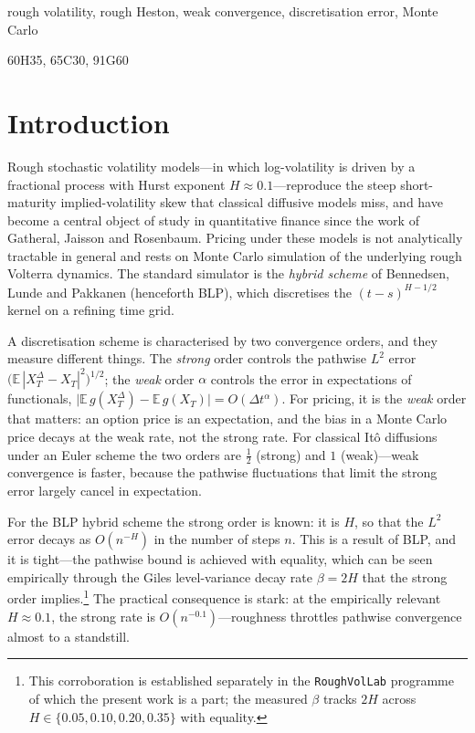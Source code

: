 \documentclass{siamonline250211}
\begin{document}
\begin{keywords}
rough volatility, rough Heston, weak convergence, discretisation error, Monte Carlo
\end{keywords}

\begin{AMS}
60H35, 65C30, 91G60
\end{AMS}

\section{Introduction}\label{sec:intro}

Rough stochastic volatility models---in which log-volatility is driven by a
fractional process with Hurst exponent $H\approx 0.1$---reproduce the steep
short-maturity implied-volatility skew that classical diffusive models miss, and
have become a central object of study in quantitative finance since the work of
Gatheral, Jaisson and Rosenbaum. Pricing under these models is not analytically
tractable in general and rests on Monte Carlo simulation of the underlying rough
Volterra dynamics. The standard simulator is the \emph{hybrid scheme} of
Bennedsen, Lunde and Pakkanen (henceforth BLP), which discretises the
$(t-s)^{H-1/2}$ kernel on a refining time grid.

A discretisation scheme is characterised by two convergence orders, and they
measure different things. The \emph{strong} order controls the pathwise
$L^2$ error $\big(\mathbb{E}\,|X_T^\Delta - X_T|^2\big)^{1/2}$; the \emph{weak}
order $\alpha$ controls the error in expectations of functionals,
$\big|\mathbb{E}\,g(X_T^\Delta) - \mathbb{E}\,g(X_T)\big| = O(\Delta t^{\alpha})$.
For pricing, it is the \emph{weak} order that matters: an option price is an
expectation, and the bias in a Monte Carlo price decays at the weak rate, not the
strong rate. For classical It\^o diffusions under an Euler scheme the two orders are
$\tfrac12$ (strong) and $1$ (weak)---weak convergence is faster, because the
pathwise fluctuations that limit the strong error largely cancel in expectation.

For the BLP hybrid scheme the strong order is known: it is $H$, so that the
$L^2$ error decays as $O(n^{-H})$ in the number of steps $n$. This is a result of
BLP, and it is tight---the pathwise bound is achieved with equality, which can be
seen empirically through the Giles level-variance decay rate $\beta = 2H$ that the
strong order implies.\footnote{This corroboration is established separately in the
\texttt{RoughVolLab} programme of which the present work is a part; the measured
$\beta$ tracks $2H$ across $H\in\{0.05,0.10,0.20,0.35\}$ with equality.} The
practical consequence is stark: at the empirically relevant $H\approx 0.1$, the
strong rate is $O(n^{-0.1})$---roughness throttles pathwise convergence almost to a
standstill.
\end{document}
